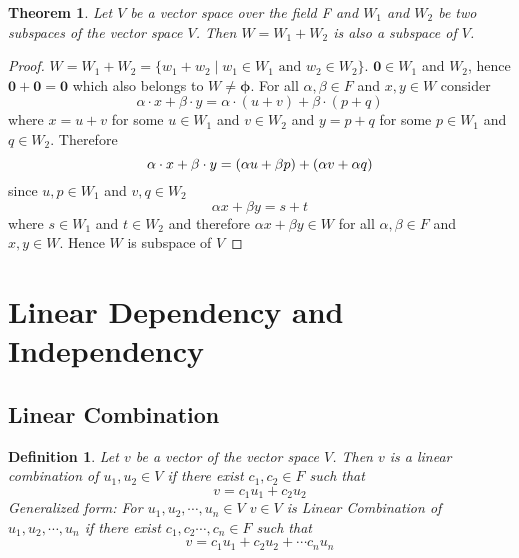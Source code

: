 \documentclass[a4paper, titlepage]{article}
\newtheorem{theorem}{Theorem}[section]
\newtheorem{definition}{Definition}[section]
\begin{document}
    \begin{theorem}
        Let $V$ be a vector space over the field F and $W_1$ and $W_2$ 
        be two subspaces of the vector space $V$. Then $W = W_1 + W_2$ 
        is also a subspace of $V$. 
    \end{theorem}
    \begin{proof}
        $W = W_1 + W_2 = \{ w_1 + w_2 \; \left. \right\vert \; w_1 \in W_1 \text{ and } w_2 \in W_2 \}$. 
        $\bm{0} \in W_1$ and $W_2$, hence $\bm{0} + \bm{0} = \bm{0}$
        which also belongs to $W \neq \bm{\phi}$. For all $\alpha, 
        \beta \in F$ and $x, y \in W$ consider
        \[
            \alpha\cdot x + \beta\cdot y = \alpha\cdot(u + v) + \beta\cdot(p + q)   
        \]
        where $x = u + v$ for some $u \in W_1$ and $v \in W_2$ and
        $y = p + q$ for some $p \in W_1$ and $q \in W_2$. Therefore
        \[            
            \alpha\cdot x + \beta\cdot y = (\alpha u + \beta p) + 
            (\alpha v + \alpha q) \\
        \]
        since $u, p \in W_1$ and $v, q \in W_2$
        \[
            \alpha x + \beta y = s + t  
        \]
        where $s \in W_1$ and $t \in W_2$ and therefore 
        $\alpha x + \beta y \in W$ for all $\alpha, 
        \beta \in F$ and $x, y \in W$. Hence $W$ is subspace of $V$
    \end{proof}

\section{Linear Dependency and Independency}

    \subsection{Linear Combination}
    \begin{definition}
        Let $v$ be a vector of the vector space $V$. Then $v$ is a linear
        combination of $u_1, u_2 \in V$ if there exist $c_1, c_2 \in F$
        such that 
        \[ \boxed{v = c_1u_1 + c_2u_2} \]
        \textup{Generalized form: } For $u_1, u_2, \cdots, u_n \in V$
        $v \in V$ is Linear Combination of $u_1, u_2, \cdots, u_n$ if
        there exist $c_1, c_2 \cdots, c_n \in F$ such that
        \[ \boxed{v = c_1u_1 + c_2u_2 + \cdots c_nu_n} \]
    \end{definition}
\end{document}
